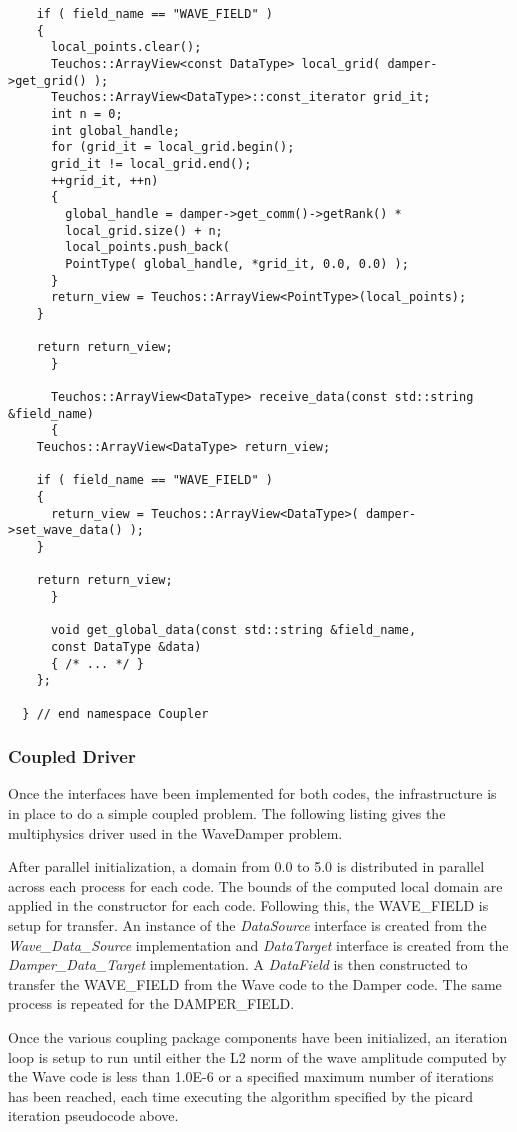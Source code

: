 \documentclass[letterpaper]{article}
\begin{document}
\begin{lstlisting}
	if ( field_name == "WAVE_FIELD" )
	{
	  local_points.clear();
	  Teuchos::ArrayView<const DataType> local_grid( damper->get_grid() );
	  Teuchos::ArrayView<DataType>::const_iterator grid_it;
	  int n = 0;
	  int global_handle;
	  for (grid_it = local_grid.begin(); 
	  grid_it != local_grid.end();
	  ++grid_it, ++n)
	  {
	    global_handle = damper->get_comm()->getRank() *
	    local_grid.size() + n;
	    local_points.push_back( 
	    PointType( global_handle, *grid_it, 0.0, 0.0) );
	  }
	  return_view = Teuchos::ArrayView<PointType>(local_points);
	}

	return return_view;
      }

      Teuchos::ArrayView<DataType> receive_data(const std::string &field_name)
      {
	Teuchos::ArrayView<DataType> return_view;

	if ( field_name == "WAVE_FIELD" )
	{
	  return_view = Teuchos::ArrayView<DataType>( damper->set_wave_data() );
	}

	return return_view;
      }

      void get_global_data(const std::string &field_name,
      const DataType &data)
      { /* ... */ }
    };

  } // end namespace Coupler
\end{lstlisting}

\subsubsection{Coupled Driver}
Once the interfaces have been implemented for both codes, the
infrastructure is in place to do a simple coupled problem. The
following listing gives the multiphysics driver used in the WaveDamper
problem.

After parallel initialization, a domain from 0.0 to 5.0 is distributed
in parallel across each process for each code. The bounds of the
computed local domain are applied in the constructor for each
code. Following this, the WAVE\_FIELD is setup for transfer. An
instance of the {\sl DataSource} interface is created from the {\sl
  Wave\_Data\_Source} implementation and {\sl DataTarget} interface
is created from the {\sl Damper\_Data\_Target} implementation. A {\sl
  DataField} is then constructed to transfer the WAVE\_FIELD from
the Wave code to the Damper code. The same process is repeated for the
DAMPER\_FIELD. 

Once the various coupling package components have been initialized, an
iteration loop is setup to run until either the L2 norm of the wave
amplitude computed by the Wave code is less than 1.0E-6 or a specified
maximum number of iterations has been reached, each time executing the
algorithm specified by the picard iteration pseudocode above.
\end{document}
